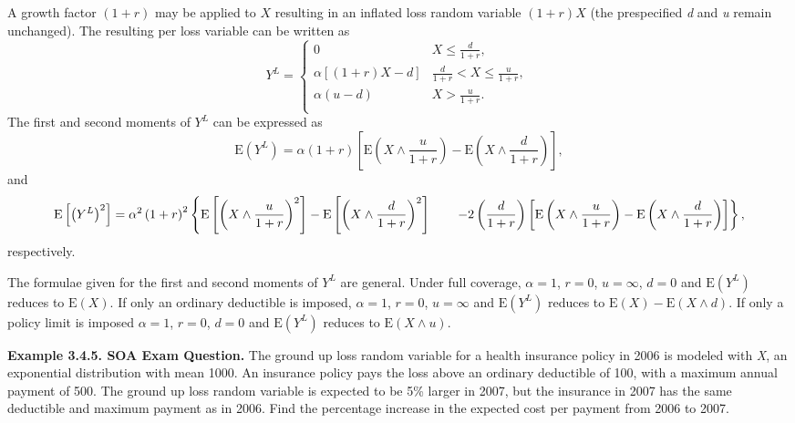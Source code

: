 \documentclass[]{book}
\theoremstyle{definition}
\theoremstyle{definition}
\theoremstyle{definition}
\theoremstyle{remark}
\begin{document}
A growth factor \(\left( 1 + r \right)\) may be applied to \(X\)
resulting in an inflated loss random variable \(\left( 1 + r \right)X\)
(the prespecified \emph{d} and \emph{u} remain unchanged). The resulting
per loss variable can be written as \[Y^{L} = \left\{ \begin{matrix}
0 & X \leq \frac{d}{1 + r}, \\
\alpha\left\lbrack \left( 1 + r \right)X - d \right\rbrack & \frac{d}{1 + r} <  X \leq \frac{u}{1 + r}, \\
\alpha\left( u - d \right) & X > \frac{u}{1 + r}. \\
\end{matrix} \right.\ \] The first and second moments of \(Y^{L}\) can
be expressed as
\[\mathrm{E}\left( Y^{L} \right) = \alpha\left( 1 + r \right)\left\lbrack \mathrm{E}\left( X \land \frac{u}{1 + r} \right) - \mathrm{E}\left( X \land \frac{d}{1 + r} \right) \right\rbrack,\]
and \[\mathrm{E}\left\lbrack \left( Y^{L} \right)^{2} 
\right\rbrack = \alpha^{2}\left( 1 + r \right)^{2}  \left\{ \mathrm{E}\left\lbrack \left( X \land \frac{u}{1 + r} \right)^{2} \right\rbrack - \mathrm{E}\left\lbrack \left( X \land \frac{d}{1 + r} \right)^{2} \right\rbrack  \right. \\
\left. \ \ \ \ \ - 2\left( \frac{d}{1 + r} \right)\left\lbrack \mathrm{E}\left( X \land \frac{u}{1 + r} \right) - \mathrm{E}\left( X \land \frac{d}{1 + r} \right) \right\rbrack \right\} ,\]
respectively.

The formulae given for the first and second moments of \(Y^{L}\) are
general. Under full coverage, \(\alpha = 1\), \(r = 0\), \(u = \infty\),
\(d = 0\) and \(\mathrm{E}\left( Y^{L} \right)\) reduces to
\(\mathrm{E}\left( X \right)\). If only an ordinary deductible is
imposed, \(\alpha = 1\), \(r = 0\), \(u = \infty\) and
\(\mathrm{E}\left( Y^{L} \right)\) reduces to
\(\mathrm{E}\left( X \right) - \mathrm{E}\left( X \land d \right)\). If
only a policy limit is imposed \(\alpha = 1\), \(r = 0\), \(d = 0\) and
\(\mathrm{E}\left( Y^{L} \right)\) reduces to
\(\mathrm{E}\left( X \land u \right)\).

\textbf{Example 3.4.5. SOA Exam Question.} The ground up loss random
variable for a health insurance policy in 2006 is modeled with \emph{X},
an exponential distribution with mean 1000. An insurance policy pays the
loss above an ordinary deductible of 100, with a maximum annual payment
of 500. The ground up loss random variable is expected to be 5\% larger
in 2007, but the insurance in 2007 has the same deductible and maximum
payment as in 2006. Find the percentage increase in the expected cost
per payment from 2006 to 2007.
\end{document}

